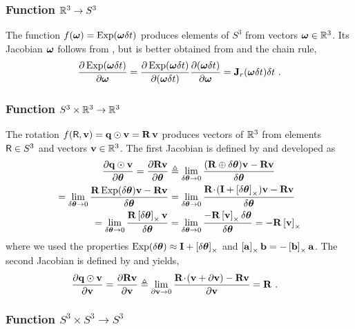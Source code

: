\subsubsection{Function $\bbR^3\to S^3$} 
\label{sec:jac_R3toSO3}

The function $f(\bw) = \Exp(\bw\dt)$ produces elements of $S^3$ from vectors $\bw\in\bbR^3$. 
Its Jacobian \wrt $\bw$ follows from , but is better obtained from  and the chain rule,
%
\begin{align*}
\dpar{\Exp(\bw\dt)}{\bw}
= \dpar{\Exp(\bw\dt)}{(\bw\dt)}\dpar{(\bw\dt)}{\bw} 
= \bfJ_r(\bw\dt)\dt
~.
\end{align*}
%


\subsubsection{Function $S^3\times\bbR^3\to\bbR^3$} 
\label{sec:jac_SO3xR3toR3}

The rotation $f(\sR,\bfv) = \bfq\od\bfv = \bfR\,\bfv$ produces vectors of $\bbR^3$ from elements $\sR\in S^3$ and vectors $\bfv\in\bbR^3$. The first Jacobian is defined by  and developed as
%
\begin{align*}
\dpar{\bfq\od\bfv}{\bth} = \dpar{\bfR\bfv}{\bth} 
&\te \lim_{\delta\bth\to0}\frac{(\bfR\oplus\delta\bth)\bfv-\bfR\bfv}{\delta\bth} \\
= \lim_{\delta\bth\to0}\frac{\bfR\Exp(\delta\bth)\bfv-\bfR\bfv}{\delta\bth} 
&= \lim_{\delta\bth\to0}\frac{\bfR\tdot(\bfI+\hatx{\delta\bth})\bfv-\bfR\bfv}{\delta\bth} \\
= \lim_{\delta\bth\to0}\frac{\bfR\hatx{\delta\bth}\bfv}{\delta\bth} 
&= \lim_{\delta\bth\to0}\frac{-\bfR\hatx{\bfv}\delta\bth}{\delta\bth} 
= -\bfR\hatx{\bfv} 
\end{align*}
%
where we used the properties $\Exp(\dth) \approx \bfI + \hatx{\dth}$ and  $\hatx{\bfa}\bfb = -\hatx{\bfb}\bfa$. 
The second Jacobian is defined by  and yields,
%
\begin{align*}
\dpar{\bfq\od\bfv}{\bfv} = \dpar{\bfR\bfv}{\bfv} 
&\te \lim_{\partial\bfv\to0}\frac{\bfR\tdot(\bfv+\partial\bfv)-\bfR\bfv}{\partial\bfv} 
= \bfR
~.
\end{align*}

\subsubsection{Function $S^3\times S^3\to S^3$}
\label{sec:jac_SO3xSO3toSO3}

